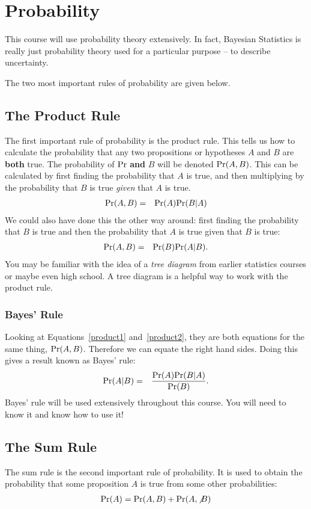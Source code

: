 \chapter{Probability}
This course will use probability theory extensively. In fact, Bayesian
Statistics is really just probability theory used for a particular purpose --
to describe uncertainty.

The two most important rules of probability are given below.

\section{The Product Rule}
The first important rule of probability is the
product rule. This tells us how to calculate the probability that any two
propositions or hypotheses $A$ and $B$ are {\bf both} true.
The probability of $\textnormal{Pr}$ {\bf and}
$B$ will be denoted $\textnormal{Pr}(A, B)$. This can be calculated by first finding the
probability that $A$ is true, and then multiplying by the probability that $B$
is true {\it given} that $A$ is true.
\begin{eqnarray}
\textnormal{Pr}(A, B) &=& \textnormal{Pr}(A)\textnormal{Pr}(B|A)\label{product1}
\end{eqnarray}
We could also have done this the other way around: first finding the
probability that $B$ is true and then the probability that $A$ is true given
that $B$ is true:
\begin{eqnarray}
\textnormal{Pr}(A, B) &=& \textnormal{Pr}(B)\textnormal{Pr}(A|B).\label{product2}
\end{eqnarray}
You may be familiar with the idea of a {\it tree diagram} from earlier
statistics courses or maybe even high school. A tree diagram is a helpful way
to work with the product rule.

\subsection{Bayes' Rule}
Looking at Equations~\ref{product1} and~\ref{product2}, they are both equations
for the same
thing, $\textnormal{Pr}(A,B)$. Therefore we can equate the right hand sides. Doing this gives
a result known as Bayes' rule:
\begin{eqnarray}
\textnormal{Pr}(A|B) &=& \frac{\textnormal{Pr}(A)\textnormal{Pr}(B|A)}{\textnormal{Pr}(B)}. \label{bayes}
\end{eqnarray}
Bayes' rule will be used extensively throughout this course. You will need to
know it and know how to use it!

\section{The Sum Rule}
The sum rule is the second important rule of probability. It is used to obtain
the probability that some proposition $A$ is true from some other
probabilities:
\begin{eqnarray}
\textnormal{Pr}(A) = \textnormal{Pr}(A, B) + \textnormal{Pr}(A, \not B)
\end{eqnarray}

